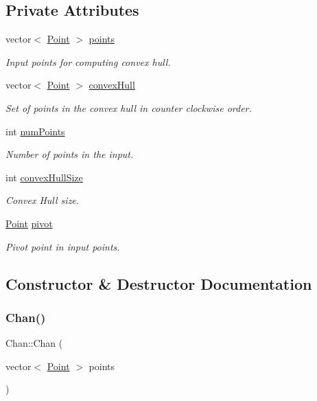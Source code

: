 \subsection*{Private Attributes}
\begin{DoxyCompactItemize}
\item 
vector$<$ \mbox{\hyperlink{classPoint}{Point}} $>$ \mbox{\hyperlink{classChan_a3c867cd91392509f20644fc59d73778c}{points}}
\begin{DoxyCompactList}\small\item\em Input points for computing convex hull. \end{DoxyCompactList}\item 
vector$<$ \mbox{\hyperlink{classPoint}{Point}} $>$ \mbox{\hyperlink{classChan_a983333f17209e944e2218f83c6db04a8}{convex\+Hull}}
\begin{DoxyCompactList}\small\item\em Set of points in the convex hull in counter clockwise order. \end{DoxyCompactList}\item 
int \mbox{\hyperlink{classChan_a9f906daeea67573ca4fc09da32d2395f}{num\+Points}}
\begin{DoxyCompactList}\small\item\em Number of points in the input. \end{DoxyCompactList}\item 
int \mbox{\hyperlink{classChan_ae77990baa3fc9811d17fed02e4b73d70}{convex\+Hull\+Size}}
\begin{DoxyCompactList}\small\item\em Convex Hull size. \end{DoxyCompactList}\item 
\mbox{\hyperlink{classPoint}{Point}} \mbox{\hyperlink{classChan_a50d101e7ce6ac726592d8dc2f341cade}{pivot}}
\begin{DoxyCompactList}\small\item\em Pivot point in input points. \end{DoxyCompactList}\end{DoxyCompactItemize}


\subsection{Constructor \& Destructor Documentation}
\mbox{\label{classChan_a0b17366e6548967ea27702d9ae37f394}} 
\subsubsection{\texorpdfstring{Chan()}{Chan()}}
{\footnotesize\ttfamily Chan\+::\+Chan (\begin{DoxyParamCaption}\item[{vector$<$ \mbox{\hyperlink{classPoint}{Point}} $>$}]{points }\end{DoxyParamCaption})}



